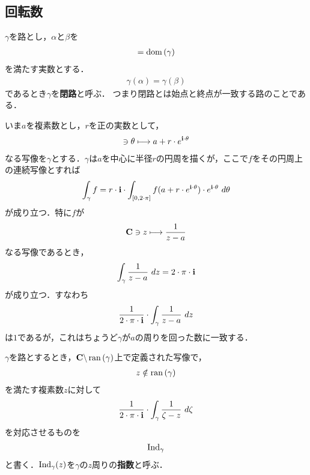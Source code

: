 \subsection{回転数}
	\begin{screen}
		\begin{dfn}[閉路]
			$\gamma$を路とし，$\alpha$と$\beta$を
			\begin{align}
				[\alpha,\beta] = \dom{\gamma}
			\end{align}
			を満たす実数とする．
			\begin{align}
				\gamma(\alpha) = \gamma(\beta)
			\end{align}
			であるとき$\gamma$を{\bf 閉路}と呼ぶ．
			つまり閉路とは始点と終点が一致する路のことである．
		\end{dfn}
	\end{screen}
	
	いま$a$を複素数とし，$r$を正の実数として，
	\begin{align}
		[0,2 \cdot \pi] \ni \theta \longmapsto a + r \cdot e^{\isym \cdot \theta}
	\end{align}
	なる写像を$\gamma$とする．$\gamma$は$a$を中心に半径$r$の円周を描くが，ここで$f$をその円周上の連続写像とすれば
	\begin{align}
		\int_{\gamma} f 
		= r \cdot \mathbf{i} \cdot \int_{[0,2 \cdot \pi]} f(a + r \cdot e^{\mathbf{i} \cdot \theta}) \cdot e^{\mathbf{i} \cdot \theta}\ d\theta
	\end{align}
	が成り立つ．特に$f$が
	\begin{align}
		\mathbf{C} \ni z \longmapsto \frac{1}{z - a}
	\end{align}
	なる写像であるとき，
	\begin{align}
		\int_{\gamma} \frac{1}{z - a}\ dz = 2 \cdot \pi \cdot \mathbf{i}
	\end{align}
	が成り立つ．すなわち
	\begin{align}
		\frac{1}{2 \cdot \pi \cdot \mathbf{i}} \cdot \int_{\gamma} \frac{1}{z - a}\ dz
	\end{align}
	は$1$であるが，これはちょうど$\gamma$が$a$の周りを回った数に一致する．
	
	\begin{screen}
		\begin{dfn}[指数]
			$\gamma$を路とするとき，$\mathbf{C} \backslash \operatorname*{ran} \left(\gamma\right)$上で定義された写像で，
			\begin{align}
				z \notin \operatorname*{ran} \left(\gamma\right)
			\end{align}
			を満たす複素数$z$に対して
			\begin{align}
				\frac{1}{2 \cdot \pi \cdot \mathbf{i}} \cdot \int_{\gamma} \frac{1}{\zeta - z}\ d\zeta
			\end{align}
			を対応させるものを
			\begin{align}
				\operatorname{Ind}_{\gamma}
			\end{align}
			と書く．$\operatorname{Ind}_{\gamma}(z)$を$\gamma$の$z$周りの{\bf 指数}\index{しすう@指数}{\bf (index)}と呼ぶ．
		\end{dfn}
	\end{screen}
	